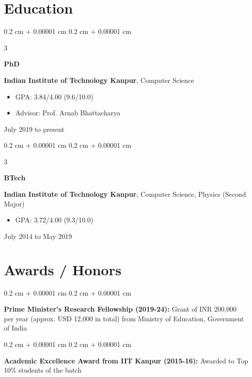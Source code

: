 \documentclass[10pt, letterpaper]{article}
\newenvironment{highlights}{
    \begin{itemize}[
        topsep=0.10 cm,
        parsep=0.10 cm,
        partopsep=0pt,
        itemsep=0pt,
        leftmargin=0.4 cm + 10pt
    ]
}{
    \end{itemize}
} %
\newenvironment{onecolentry}{
    \begin{adjustwidth}{
        0.2 cm + 0.00001 cm
    }{
        0.2 cm + 0.00001 cm
    }
}{
    \end{adjustwidth}
} %
\newenvironment{threecolentry}[3][]{
    \onecolentry
    \def\thirdColumn{#3}
    \setcolumnwidth{1 cm, \fill, 4.5 cm}
    \begin{paracol}{3}
    {\raggedright #2} \switchcolumn
}{
    \switchcolumn \raggedleft \thirdColumn
    \end{paracol}
    \endonecolentry
} %
\begin{document}
    
    \section{Education}



        
        \begin{threecolentry}{\textbf{PhD}}{
            July 2019 to present
        }
            \textbf{Indian Institute of Technology Kanpur}, Computer Science
            \begin{highlights}
                \item GPA: 3.84/4.00 (9.6/10.0)
                \item Advisor: Prof. Arnab Bhattacharya
            \end{highlights}
        \end{threecolentry}

        \vspace{0.2 cm}

        \begin{threecolentry}{\textbf{BTech}}{
            July 2014 to May 2019
        }
            \textbf{Indian Institute of Technology Kanpur}, Computer Science, Physics (Second Major)
            \begin{highlights}
                \item GPA: 3.72/4.00 (9.3/10.0)
            \end{highlights}
        \end{threecolentry}


    
    \section{Awards / Honors}



        
        \begin{onecolentry}
            \textbf{Prime Minister's Research Fellowship (2019-24):} Grant of INR 200,000 per year (approx. USD 12,000 in total) from Ministry of Education, Government of India
        \end{onecolentry}

        \vspace{0.2 cm}

        \begin{onecolentry}
            \textbf{Academic Excellence Award from IIT Kanpur (2015-16):} Awarded to Top 10\% students of the batch
        \end{onecolentry}
\end{document}
